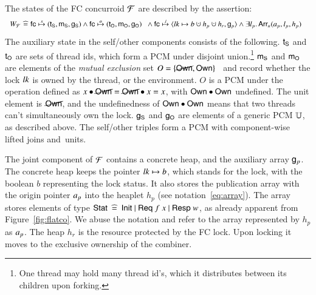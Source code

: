 The states of the FC concurroid $\mathcal{F}$ are described by the assertion:
% 
%
\[
{\small
\begin{array}{c}
  W_{\fccon} \!\eqdef\! 
  \hfc \spts (\tS, \mS, \gS) \aand 
  \hfc \opts (\tO, \mO, \gO) \begin{array}[t]{l}
    \hbox{}\aand \hfc \jpts {\angled{\lk \hpts b \hunion h_p \hunion h_r, \gp}} \aand \exists l_p\ldot \Array{\ap}{n}{l_p}{h_p} 
\end{array}
\end{array}
}
\]
%
The auxiliary state in the self/other components consists of the
following. $\mathsf{t}_{{\mathsf{S}}}$ and $\mathsf{t}_{{\mathsf{O}}}$ are sets of thread ids, which form a PCM
under disjoint union.\footnote{One thread may hold many thread id's,
  which it distributes between its children upon forking.}
%
$\mathsf{m}_{{\mathsf{S}}}$ and $\mathsf{m}_{{\mathsf{O}}}$ are elements of the \emph{mutual exclusion} set $O =
\{\cancel{\mathsf{Own}},
\mathsf{Own}\}$~\cite{LeyWild-Nanevski:POPL13,Nanevski-al:ESOP14} and
record whether the lock $\mathit{lk}$ is owned by the thread, or the
environment. $O$ is a PCM under the operation defined as $x
\bullet \cancel{\mathsf{Own}} = \cancel{\mathsf{Own}} \bullet x = x$, with $\mathsf{Own} \bullet
\mathsf{Own}$ undefined. The unit element is $\cancel{\mathsf{Own}}$, and the
undefinedness of $\mathsf{Own} \bullet \mathsf{Own}$ means that two threads
can't simultaneously own the lock.
%
$\mathsf{g}_{{\mathsf{S}}}$ and $\mathsf{g}_{{\mathsf{O}}}$ are elements of a generic PCM $\mathbb{U}$, as
described above.
% 
The self/other triples form a PCM with component-wise lifted joins
and~units.
 
The joint component of $\mathcal{F}$ contains a concrete heap, and the
auxiliary array $\mathsf{g}_{p}$.
%
The concrete heap keeps the pointer $\mathit{lk} \mapsto b$, which stands for
the lock, with the boolean $b$ representing the lock status. It also
stores the publication array with the origin pointer $\text{\emph{a}}_p$ into the
heaplet $h_p$ (see notation~\eqref{eq:array}). The array stores
elements of type $\mathsf{Stat} \mathrel{\:\widehat{=}\:} \mathsf{Init}~|~\mathsf{Req}\ {f}~{x}~|~\mathsf{Resp}\ {w}$,
as already apparent from Figure~\ref{fig:flatco}.  We abuse the
notation and refer to the array represented by $h_p$ as $\text{\emph{a}}_p$.
%
The heap $h_r$ is the resource protected by the FC lock. Upon locking
it moves to the exclusive ownership of the combiner. 


